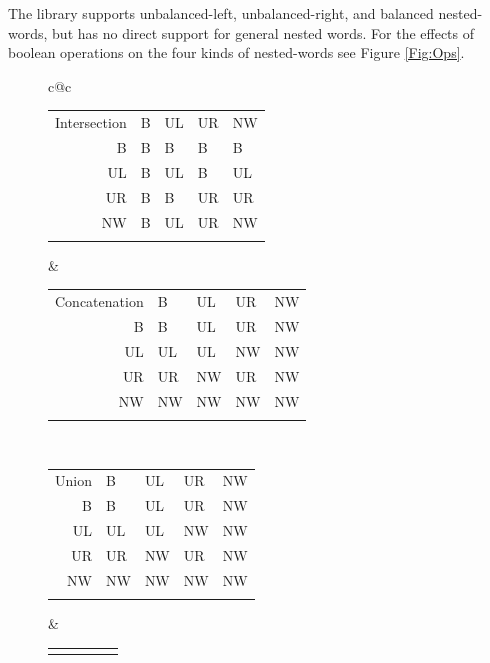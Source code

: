 The library supports unbalanced-left, unbalanced-right, and balanced
nested-words, but has no direct support for general nested words.  For the
effects of boolean operations on the four kinds of nested-words see Figure
\ref{Fig:Ops}.

\begin{figure}[htb]
  \centering
\begin{tabular}{c@{\hspace{1cm}}c}
  \begin{tabular}{|| r || l | l | l | l ||}
\hhline{|t:=====:t|}
    Intersection & B & UL & UR & NW \\
\hhline{||=#=|=|=|=||}
    B & B & B & B & B \\
\hhline{||-||-|-|-|-||}
    UL & B & UL & B & UL \\
 \hhline{||-||-|-|-|-||}
    UR & B & B & UR & UR \\
\hhline{||-||-|-|-|-||}
    NW & B & UL & UR & NW \\
\hhline{|b:=====:b|}
  \end{tabular}
\vspace{1cm} &
  \begin{tabular}{|| r || l | l | l | l ||}
\hhline{|t:=====:t|}
    Concatenation & B & UL & UR & NW \\
\hhline{||=#=|=|=|=||}
    B & B & UL & UR & NW \\
\hhline{||-||-|-|-|-||}
    UL & UL & UL & NW & NW \\
\hhline{||-||-|-|-|-||}
    UR & UR & NW & UR & NW \\
\hhline{||-||-|-|-|-||}
    NW & NW & NW & NW & NW \\
\hhline{|b:=====:b|}
  \end{tabular} \\
\vspace{1cm}
  \begin{tabular}{|| r || l | l | l | l ||}
\hhline{|t:=====:t|}
    Union & B & UL & UR & NW \\
\hhline{||=#=|=|=|=||}
    B & B & UL & UR & NW \\
\hhline{||-||-|-|-|-||}
    UL & UL & UL & NW & NW \\
\hhline{||-||-|-|-|-||}
    UR & UR & NW & UR & NW \\
\hhline{||-||-|-|-|-||}
    NW & NW & NW & NW & NW \\
\hhline{|b:=====:b|}
  \end{tabular} &
  \begin{tabular}{|| r || l | l | l | l ||}
\hhline{|t:=====:t|}

\end{tabular}
\end{tabular}
\end{figure}
